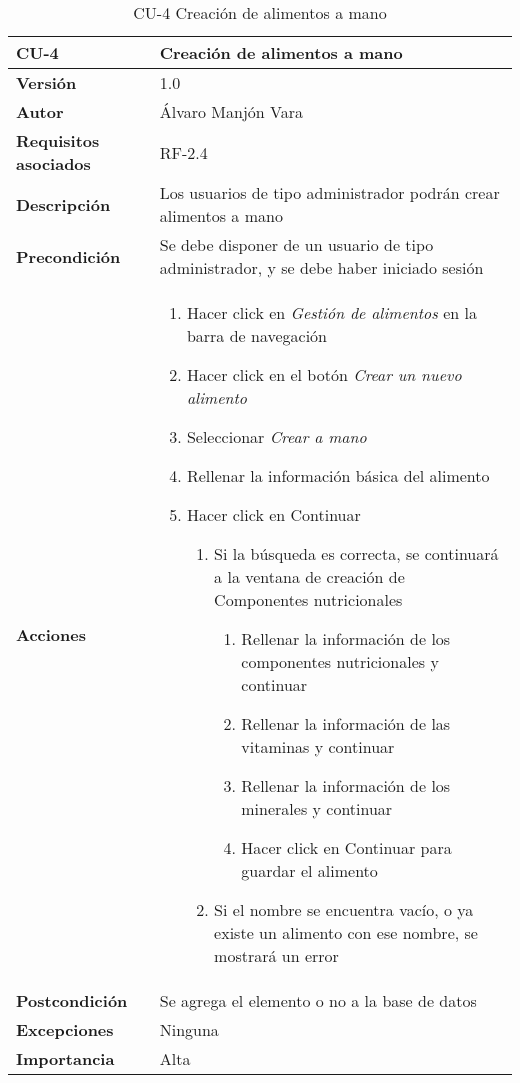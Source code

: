 \begin{table}[htp]
	\centering
	\begin{tabularx}{\linewidth}{ p{} p{} }
		\toprule
		\textbf{CU-4}    & \textbf{Creación de alimentos a mano}\\
		\toprule
		\textbf{Versión}              & 1.0    \\
		\textbf{Autor}                & Álvaro Manjón Vara \\
		\textbf{Requisitos asociados} & RF-2.4 \\
		\textbf{Descripción}          & Los usuarios de tipo administrador podrán crear alimentos a mano \\
		\textbf{Precondición}         & Se debe disponer de un usuario de tipo administrador, y se debe haber iniciado sesión \\
		\textbf{Acciones}             &
		\begin{enumerate}
			\def\labelenumi{\arabic{enumi}.}
			\tightlist
			\item Hacer click en \textit{Gestión de alimentos} en la barra de navegación
			\item Hacer click en el botón \textit{Crear un nuevo alimento}
			\item Seleccionar \textit{Crear a mano}
			\item Rellenar la información básica del alimento
			\item Hacer click en Continuar
			\begin{enumerate}
				\item Si la búsqueda es correcta, se continuará a la ventana de creación de Componentes nutricionales
				\begin{enumerate}
					\item Rellenar la información de los componentes nutricionales y continuar
					\item Rellenar la información de las vitaminas y continuar
					\item Rellenar la información de los minerales y continuar
					\item Hacer click en Continuar para guardar el alimento
				\end{enumerate}
				\item Si el nombre se encuentra vacío, o ya existe un alimento con ese nombre, se mostrará un error
			\end{enumerate}
		\end{enumerate}\\
		\textbf{Postcondición}        & Se agrega el elemento o no a la base de datos \\
		\textbf{Excepciones}          & Ninguna \\
		\textbf{Importancia}          & Alta \\
		\bottomrule
	\end{tabularx}
	\caption{CU-4 Creación de alimentos a mano}
\end{table}
\afterpage{\clearpage}

